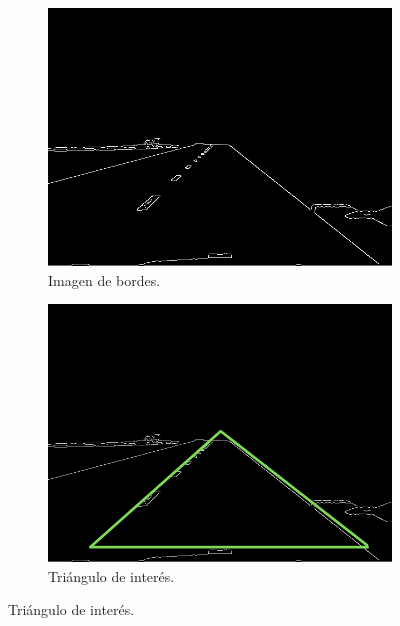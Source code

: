 \begin{figure}[h]
    \centering
    \begin{subfigure}[b]{0.3\textwidth}
         \centering
         \includegraphics[width=\textwidth]{Figures/Figures_Cap04/edge_lanes.png}
         \caption{Imagen de bordes.}
         \label{fig:edge_lines}
    \end{subfigure}
    \hfill
    \begin{subfigure}[b]{0.3\textwidth}
         \centering
         \includegraphics[width=\textwidth]{Figures/Figures_Cap04/triangle_of_interest.png}
         \caption{Triángulo de interés.}
         \label{fig:triangle_interest}
     \end{subfigure}
     \hfill

\end{figure}
